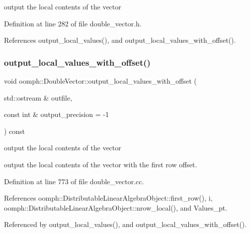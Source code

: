 output the local contents of the vector 



Definition at line 282 of file double\+\_\+vector.\+h.



References output\+\_\+local\+\_\+values(), and output\+\_\+local\+\_\+values\+\_\+with\+\_\+offset().

\mbox{\label{classoomph_1_1DoubleVector_afc5d6ab2c9ba7a0f307cc419a331df70}} 
\subsubsection{\texorpdfstring{output\+\_\+local\+\_\+values\+\_\+with\+\_\+offset()}{output\_local\_values\_with\_offset()}\hspace{0.1cm}{\footnotesize\ttfamily [1/2]}}
{\footnotesize\ttfamily void oomph\+::\+Double\+Vector\+::output\+\_\+local\+\_\+values\+\_\+with\+\_\+offset (\begin{DoxyParamCaption}\item[{std\+::ostream \&}]{outfile,  }\item[{const int \&}]{output\+\_\+precision = {\ttfamily -\/1} }\end{DoxyParamCaption}) const}



output the local contents of the vector 

output the local contents of the vector with the first row offset. 

Definition at line 773 of file double\+\_\+vector.\+cc.



References oomph\+::\+Distributable\+Linear\+Algebra\+Object\+::first\+\_\+row(), i, oomph\+::\+Distributable\+Linear\+Algebra\+Object\+::nrow\+\_\+local(), and Values\+\_\+pt.



Referenced by output\+\_\+local\+\_\+values(), and output\+\_\+local\+\_\+values\+\_\+with\+\_\+offset().

\mbox{\label{classoomph_1_1DoubleVector_aa9f03b47d00fe70e4f5e4f2474b48bf4}} 
